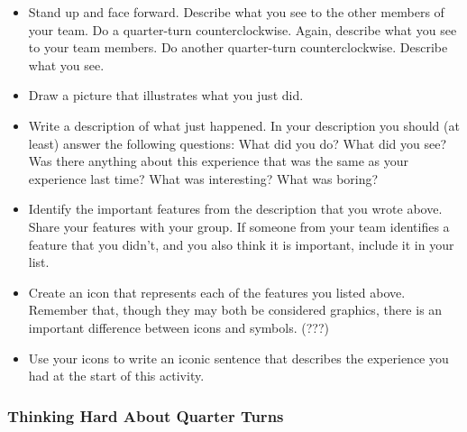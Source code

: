 \documentclass[11pt]{article}
\newenvironment{task}
	{\begin{mdframed}[linecolor=lightgray, linewidth=3pt]\raggedright}
	{\end{mdframed}}
\theoremstyle{definition}
\begin{document}
\begin{task}
\begin{itemize}
  \item Stand up and face forward. Describe what you see to the other members of your team. Do a quarter-turn counterclockwise. Again, describe what you see to your team members. Do another quarter-turn 
    counterclockwise. Describe what you see. 
  \item Draw a picture that illustrates what you just did.
  \item Write a description of what just happened. In your description you should (at least) answer the following questions: What 
    did you do? What did you see? Was there anything about this experience that was the same as your experience last time? What was interesting? What was boring?
  \item Identify the important features from the description that you wrote above. Share your features with your group. If someone from your team identifies a feature 
    that you didn’t, and you also think it is important, include it in your list.
  \item Create an icon that represents each of the features you listed above. Remember that, though they may both be considered graphics, there is an important difference between icons and symbols. (???)
  \item Use your icons to write an iconic sentence that describes the experience you had at the start of this activity.
\end{itemize}
\end{task}

\subsubsection{Thinking Hard About Quarter Turns}
\end{document}
